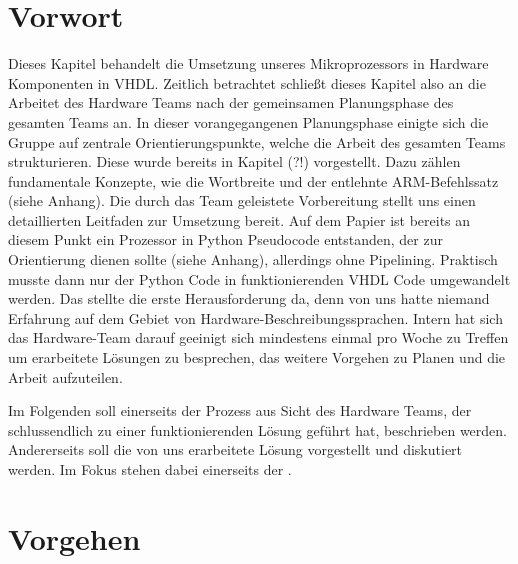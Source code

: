 \documentclass[paper=a4,fontsize=12pt,twocolumn]{scrreprt}
\begin{document}
\section{Vorwort}

Dieses Kapitel behandelt die Umsetzung unseres Mikroprozessors in Hardware Komponenten in VHDL.
Zeitlich betrachtet schließt dieses Kapitel also an die Arbeitet des Hardware Teams nach der gemeinsamen Planungsphase des gesamten Teams an.
In dieser vorangegangenen Planungsphase einigte sich die Gruppe auf zentrale Orientierungspunkte, welche die Arbeit des gesamten Teams strukturieren.
Diese wurde bereits in Kapitel (?!) vorgestellt.
Dazu zählen fundamentale Konzepte, wie die Wortbreite und der entlehnte ARM-Befehlssatz (siehe Anhang).
Die durch das Team geleistete Vorbereitung stellt uns einen detaillierten Leitfaden zur Umsetzung bereit.
Auf dem Papier ist bereits an diesem Punkt ein Prozessor in Python Pseudocode entstanden, der zur Orientierung dienen sollte (siehe Anhang), allerdings ohne Pipelining.
Praktisch musste dann nur der Python Code in funktionierenden VHDL Code umgewandelt werden. Das stellte die erste Herausforderung da, denn von uns hatte niemand Erfahrung auf dem Gebiet von Hardware-Beschreibungssprachen.
Intern hat sich das Hardware-Team darauf geeinigt sich mindestens einmal pro Woche zu Treffen um erarbeitete Lösungen zu besprechen, das weitere Vorgehen zu Planen und die Arbeit aufzuteilen.

Im Folgenden soll einerseits der Prozess aus Sicht des Hardware Teams, der schlussendlich zu einer funktionierenden Lösung geführt hat, beschrieben werden.
Andererseits soll die von uns erarbeitete Lösung vorgestellt und diskutiert werden.
Im Fokus stehen dabei einerseits der .

\section{Vorgehen}
\end{document}
